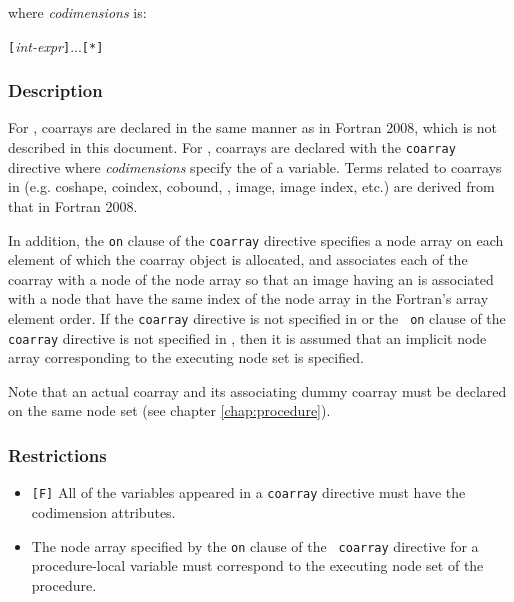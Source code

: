 where {\it codimensions} is:

\vspace{0.3cm}
\hspace{0.5cm} {\openb}{\tt [}{\it int-expr}{\tt ]}...{\closeb}{\tt [*]}

\subsubsection*{Description}

For {\XMPF}, coarrays are declared in the same manner as in Fortran
2008, which is not described in this document.
%
For {\XMPC}, coarrays are declared with the {\tt coarray} directive
where {\it codimensions} specify the  of a variable.
%
Terms related to coarrays in {\XMP} (e.g. coshape, coindex,
cobound, , image, image index, etc.) are derived from
that in Fortran 2008.

In addition, the {\tt on} clause of the {\tt coarray} directive
specifies a node array on each element of which the coarray object is
allocated, and associates each {\it {}} of the coarray with a
node of the node array so that an image having an {\it {}} is associated with a node that have the same index of the node
array in the Fortran's array element order.
%
If the {\tt coarray} directive is not specified in {\XMPF} or the {\tt
on} clause of the {\tt coarray} directive is not specified in {\XMPC},
then it is assumed that an implicit node array corresponding to the
executing node set is specified.

Note that an actual coarray and its associating dummy coarray must be
declared on the same node set (see chapter \ref{chap:procedure}).

\subsubsection*{Restrictions}

\begin{itemize}
 \item \verb![F]! All of the variables appeared in a {\tt coarray}
       directive must have the codimension attributes.
 \item The node array specified by the {\tt on} clause of the {\tt
       coarray} directive for a procedure-local variable must
       correspond to the executing node set of the procedure.
\end{itemize}

